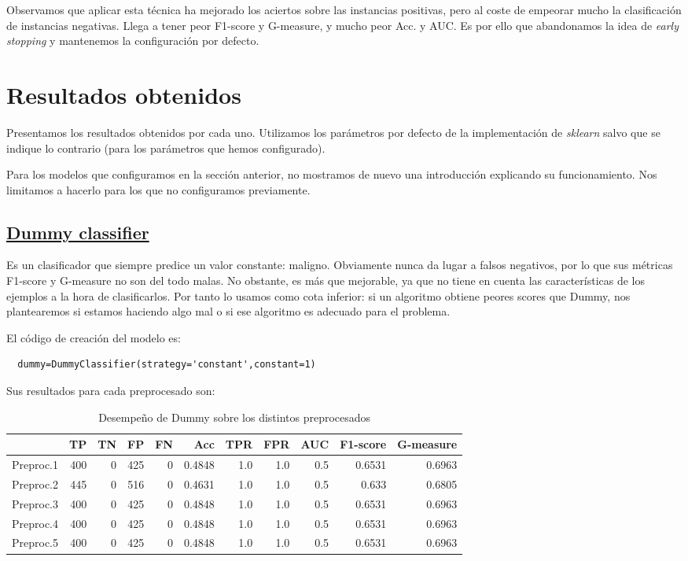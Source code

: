 \documentclass{article}
\begin{document}
Observamos que aplicar esta técnica ha mejorado los aciertos sobre las
instancias positivas, pero al coste de empeorar mucho la clasificación
de instancias negativas. Llega a tener peor F1-score y G-measure, y
mucho peor Acc. y AUC. Es por ello que abandonamos la idea de
\emph{early stopping} y mantenemos la configuración por defecto.

\section{Resultados obtenidos} \label{sec:resultados}

Presentamos los resultados obtenidos por cada uno. Utilizamos los
parámetros por defecto de la implementación de \textit{sklearn} salvo
que se indique lo contrario (para los parámetros que hemos
configurado).

Para los modelos que configuramos en la sección anterior, no mostramos
de nuevo una introducción explicando su funcionamiento. Nos limitamos
a hacerlo para los que no configuramos previamente.

\subsection{\href{https://scikit-learn.org/stable/modules/generated/sklearn.dummy.DummyClassifier.html}{Dummy classifier}}

Es un clasificador que siempre predice un valor constante:
maligno. Obviamente nunca da lugar a falsos negativos, por lo que sus
métricas F1-score y G-measure no son del todo malas. No obstante, es
más que mejorable, ya que no tiene en cuenta las características de
los ejemplos a la hora de clasificarlos. Por tanto lo usamos como cota
inferior: si un algoritmo obtiene peores scores que Dummy, nos
plantearemos si estamos haciendo algo mal o si ese algoritmo es
adecuado para el problema.

El código de creación del modelo es:
\begin{lstlisting}
  dummy=DummyClassifier(strategy='constant',constant=1)
\end{lstlisting}

Sus resultados para cada preprocesado son:

\begin{table}[H]
\centering
\caption{Desempeño de Dummy sobre los distintos preprocesados}
\label{tab:dummy}
\begin{tabular}{|lrrrrrrrrrr|}
\hline
 & TP & TN & FP & FN & Acc & TPR & FPR & AUC & F1-score & G-measure\\ \hline
  Preproc.1 & 400 & 0 & 425 & 0 & 0.4848 & 1.0 & 1.0 & 0.5 & 0.6531 & 0.6963\\
  Preproc.2 & 445 & 0 & 516 & 0 & 0.4631 & 1.0 & 1.0 & 0.5 & 0.633 & 0.6805\\
  Preproc.3 & 400 & 0 & 425 & 0 & 0.4848 & 1.0 & 1.0 & 0.5 & 0.6531 & 0.6963\\
  Preproc.4 & 400 & 0 & 425 & 0 & 0.4848 & 1.0 & 1.0 & 0.5 & 0.6531 & 0.6963\\
  Preproc.5 & 400 & 0 & 425 & 0 & 0.4848 & 1.0 & 1.0 & 0.5 & 0.6531 & 0.6963\\
\hline
\end{tabular}
\end{table}
\end{document}

